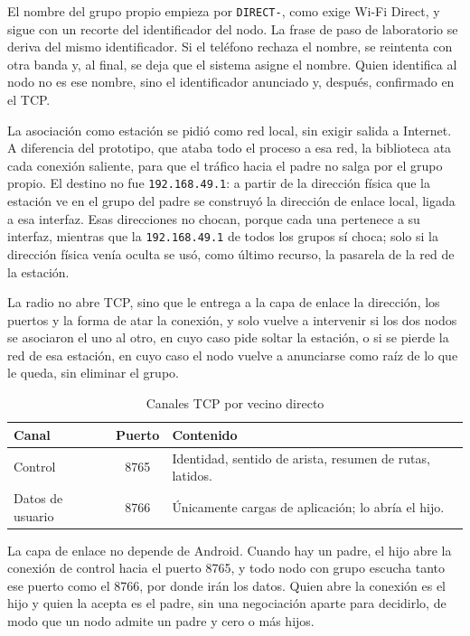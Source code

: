 \documentclass[12pt,oneside]{scrreprt}
\begin{document}
El nombre del grupo propio empieza por \texttt{DIRECT-}, como exige Wi-Fi Direct, y sigue con un recorte del identificador del nodo. La frase de paso de laboratorio se deriva del mismo identificador. Si el teléfono rechaza el nombre, se reintenta con otra banda y, al final, se deja que el sistema asigne el nombre. Quien identifica al nodo no es ese nombre, sino el identificador anunciado y, después, confirmado en el TCP.

La asociación como estación se pidió como red local, sin exigir salida a Internet. A diferencia del prototipo, que ataba todo el proceso a esa red, la biblioteca ata cada conexión saliente, para que el tráfico hacia el padre no salga por el grupo propio. El destino no fue \texttt{192.168.49.1}: a partir de la dirección física que la estación ve en el grupo del padre se construyó la dirección de enlace local, ligada a esa interfaz. Esas direcciones no chocan, porque cada una pertenece a su interfaz, mientras que la \texttt{192.168.49.1} de todos los grupos sí choca; solo si la dirección física venía oculta se usó, como último recurso, la pasarela de la red de la estación.

La radio no abre TCP, sino que le entrega a la capa de enlace la dirección, los puertos y la forma de atar la conexión, y solo vuelve a intervenir si los dos nodos se asociaron el uno al otro, en cuyo caso pide soltar la estación, o si se pierde la red de esa estación, en cuyo caso el nodo vuelve a anunciarse como raíz de lo que le queda, sin eliminar el grupo.

\begin{table}[H]
\centering
\singlespacing
\caption{Canales TCP por vecino directo}
\label{tab:met-canales}
\renewcommand{\arraystretch}{1.15}
\begin{tabularx}{\textwidth}{@{} l c X @{}}
\toprule
Canal & Puerto & Contenido \\
\midrule
Control & 8765 & Identidad, sentido de arista, resumen de rutas, latidos. \\
Datos de usuario & 8766 & Únicamente cargas de aplicación; lo abría el hijo. \\
\bottomrule
\end{tabularx}
\end{table}

La capa de enlace no depende de Android. Cuando hay un padre, el hijo abre la conexión de control hacia el puerto 8765, y todo nodo con grupo escucha tanto ese puerto como el 8766, por donde irán los datos. Quien abre la conexión es el hijo y quien la acepta es el padre, sin una negociación aparte para decidirlo, de modo que un nodo admite un padre y cero o más hijos.
\end{document}
